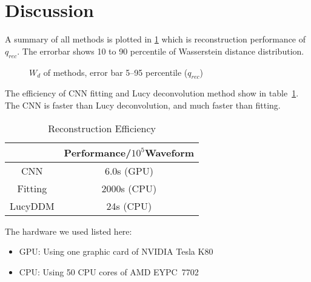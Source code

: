 \section{Discussion} %
\label{sec:discussion}

A summary of all methods is plotted in \ref{fig:chargesummary} which is reconstruction performance of $q_{rec}$. The errorbar shows 10 to 90 percentile of Wasserstein distance distribution. 

\begin{figure}[H]
    \centering
    \scalebox{0.6}{}
    \caption{\label{fig:chargesummary} $W_{d}$ of methods, error bar 5--95 percentile ($q_{rec}$)}
\end{figure}

The efficiency of CNN fitting and Lucy deconvolution method show in table~\ref{fig:efficiency}. The CNN is faster than Lucy deconvolution, and much faster than fitting. 

\begin{table}[H]
    \centering
    \caption{\label{fig:efficiency} Reconstruction Efficiency}
    \begin{tabular}{c|c}
        \hline
        & Performance/$10^{5}$Waveform \\
        \hline
        CNN & 6.0s (GPU) \\
        \hline
        Fitting & 2000s (CPU) \\
        \hline
        LucyDDM & 24s (CPU) \\
        \hline
    \end{tabular}
\end{table}
\hspace{4mm}

The hardware we used listed here: 
\begin{center}
\begin{itemize}
    \item GPU: Using one graphic card of NVIDIA\textsuperscript{\textregistered} Tesla\textsuperscript{\textregistered} K80
    \item CPU: Using 50 CPU cores of AMD EYPC\texttrademark\ 7702
\end{itemize}
\end{center}

